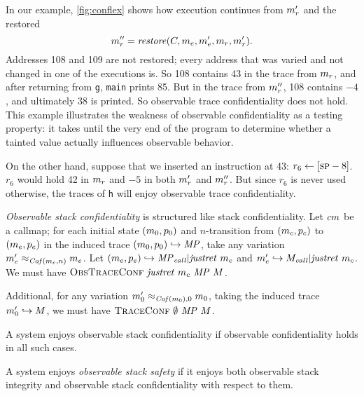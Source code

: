 \documentclass[acmsmall,review,anonymous]{acmart}\settopmatter{printfolios=true,printccs=false,printacmref=false}
\begin{document}
{{      In our example, \cref{fig:conflex} shows how execution continues from
      \(m_r'\) and the restored
      \[m_r'' = \mathit{restore}(C,
      m_e,m_e',m_r,m_r').
      \]
      Addresses 108 and 109
      are not restored; every address that was varied and not changed in one
      of the executions is. So 108 contains 43 in the trace from \(m_r\),
      and after returning from {\tt g}, {\tt main} prints 85. But in the trace
      from \(m_r''\), 108 contains $-4$, and ultimately 38 is printed.
      So observable trace confidentiality does not hold. This example
      illustrates the weakness of observable confidentiality as a testing
      property: it takes until the very end of the program to determine whether
      a tainted value actually influences observable behavior.

      On the other hand, suppose that we inserted an instruction at 43:
      \(r_6 \leftarrow [\textsc{sp}-8]\). \(r_6\) would hold 42 in \(m_r\)
      and $-5$ in both \(m_r'\) and \(m_r''\). But since \(r_6\) is
      never used otherwise, the traces of {\tt h} will enjoy observable trace
      confidentiality.


      {\em Observable stack confidentiality} is structured like stack
      confidentiality. Let \(cm\) be a callmap; for each initial
      state \((m_0, p_0)\) and \(n\)-transition from \((m_c,p_c)\)
      to \((m_e,p_e)\) in the induced trace
      \((m_0,p_0) \hookrightarrow \mathit{MP}\), take any
      variation \(m_e' \approx_{\mathit{Cof}(m_c,n)} m_e\). Let
      \((m_e,p_e) \hookrightarrow \mathit{MP}_{\mathit{call}} |
      \mathit{justret}\ m_c\) and \(m_e' \hookrightarrow M_{\mathit{call}} |
      \mathit{justret}\ m_c\). We must have \(\text{\sc ObsTraceConf} ~
      \mathit{justret}\ m_c ~ \mathit{MP} ~ M\).

      Additional, for any variation \(m_0' \approx_{\mathit{Cof}(m_0),0}
      m_0\), taking the induced trace  \(m_0' \hookrightarrow
      M\), we must have \(\text{\sc TraceConf} ~ \emptyset ~ \mathit{MP} ~ M\).

      A system enjoys observable stack confidentiality if observable
      confidentiality holds in all such cases.

    A system enjoys {\em observable stack safety}
    if it enjoys both observable stack integrity and
      observable stack confidentiality with respect to them.

}}
\end{document}
